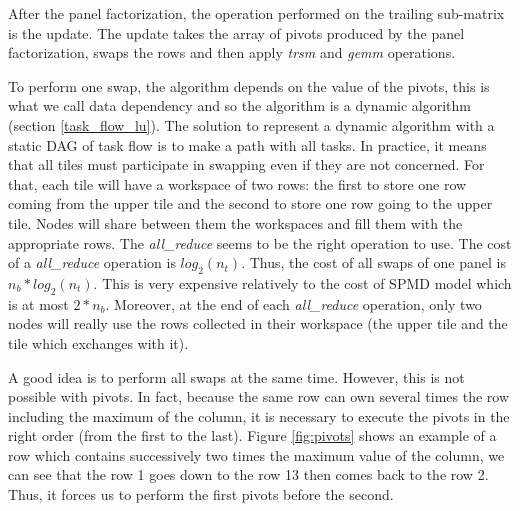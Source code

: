 After the panel factorization, the operation performed on the trailing sub-matrix is the update. The update takes the array of pivots produced by the panel factorization, swaps the rows and then apply \emph{trsm} and \emph{gemm} operations.

To perform one swap, the algorithm depends on the value of the pivots, this is what we call data dependency and so the algorithm is a dynamic algorithm (section \ref{task_flow_lu}). The solution to represent a dynamic algorithm with a static DAG of task flow is to make a path with all tasks. In practice, it means that all tiles must participate in swapping even if they are not concerned.
For that, each tile will have a workspace of two rows: the first to store one row coming from the upper tile and the second to store one row going to the upper tile. Nodes will share between them the workspaces and fill them with the appropriate rows.
The \emph{all\_reduce} seems to be the right operation to use. The cost of a \emph{all\_reduce} operation is $log_2(n_t)$. Thus, the cost of all swaps of one panel is $n_b*log_2(n_t)$. This is very expensive relatively to the cost of SPMD model which is at most $2*n_b$.
Moreover, at the end of each \emph{all\_reduce} operation, only two nodes will really use the rows collected in their workspace (the upper tile and the tile which exchanges with it).

A good idea is to perform all swaps at the same time. However, this is not possible with pivots. In fact, because the same row can own several times the row including the maximum of the column, it is necessary to execute the pivots in the right order (from the first to the last). Figure \ref{fig:pivots} shows an example of a row which contains successively two times the maximum value of the column, we can see that the row 1 goes down to the row 13 then comes back to the row 2. Thus, it forces us to perform the first pivots before the second.

